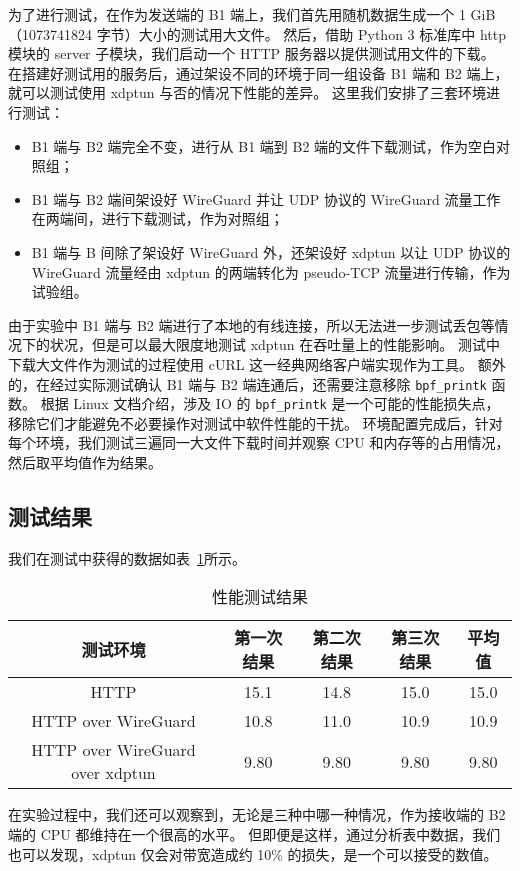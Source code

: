 为了进行测试，在作为发送端的 B1 端上，我们首先用随机数据生成一个 1 GiB（1073741824 字节）大小的测试用大文件。
然后，借助 Python 3 标准库中 http 模块的 server 子模块，我们启动一个 HTTP 服务器以提供测试用文件的下载。
在搭建好测试用的服务后，通过架设不同的环境于同一组设备 B1 端和 B2 端上，就可以测试使用 xdptun 与否的情况下性能的差异。
这里我们安排了三套环境进行测试：

\begin{itemize}
  \item B1 端与 B2 端完全不变，进行从 B1 端到 B2 端的文件下载测试，作为空白对照组；
  \item B1 端与 B2 端间架设好 WireGuard 并让 UDP 协议的 WireGuard 流量工作在两端间，进行下载测试，作为对照组；
  \item B1 端与 B 间除了架设好 WireGuard 外，还架设好 xdptun 以让 UDP 协议的 WireGuard 流量经由 xdptun 的两端转化为 pseudo-TCP 流量进行传输，作为试验组。
\end{itemize}

由于实验中 B1 端与 B2 端进行了本地的有线连接，所以无法进一步测试丢包等情况下的状况，但是可以最大限度地测试 xdptun 在吞吐量上的性能影响。
测试中下载大文件作为测试的过程使用 cURL 这一经典网络客户端实现作为工具。
额外的，在经过实际测试确认 B1 端与 B2 端连通后，还需要注意移除 \texttt{bpf\_printk} 函数。
根据 Linux 文档介绍，涉及 IO 的 \texttt{bpf\_printk} 是一个可能的性能损失点，移除它们才能避免不必要操作对测试中软件性能的干扰。
环境配置完成后，针对每个环境，我们测试三遍同一大文件下载时间并观察 CPU 和内存等的占用情况，然后取平均值作为结果。

\subsection{测试结果}

我们在测试中获得的数据如表~\ref{tab:perf-test}所示。

\begin{table}[h]
  \centering
  \caption{性能测试结果}
  \label{tab:perf-test}
  \begin{tabular}{c c c c c}
    \toprule
    测试环境 & 第一次结果 & 第二次结果 & 第三次结果 & 平均值 \\
    \midrule
    HTTP & 15.1 & 14.8 & 15.0 & 15.0 \\
    HTTP over WireGuard & 10.8 & 11.0 & 10.9 & 10.9 \\
    HTTP over WireGuard over xdptun & 9.80 & 9.80 & 9.80 & 9.80 \\
    \bottomrule
  \end{tabular}
\end{table}

在实验过程中，我们还可以观察到，无论是三种中哪一种情况，作为接收端的 B2 端的 CPU 都维持在一个很高的水平。
但即便是这样，通过分析表中数据，我们也可以发现，xdptun 仅会对带宽造成约 10\% 的损失，是一个可以接受的数值。

